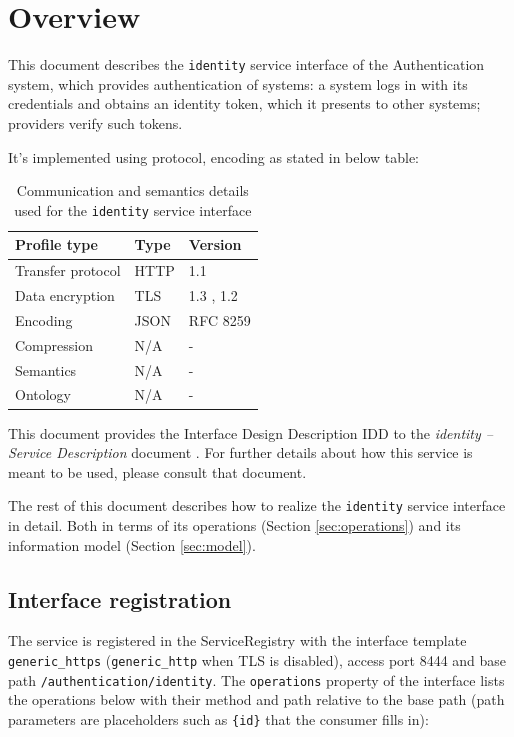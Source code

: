 \documentclass[a4paper]{arrowhead}
\begin{document}
\section{Overview}
\label{sec:overview}

This document describes the \texttt{identity} service interface of the Authentication system, which provides authentication of systems: a system logs in with its credentials and obtains an identity token, which it presents to other systems; providers verify such tokens.

It's implemented using protocol, encoding as stated in below table:
\begin{table}[ht!]
  \centering
  \begin{tabular}{|l|l|l|}
    \hline
    \rowcolor{gray!33} Profile type & Type & Version \\ \hline
    Transfer protocol & HTTP & 1.1 \cite{rfc9112} \\ \hline
    Data encryption & TLS & 1.3 \cite{rfc8446}, 1.2 \cite{rfc5246} \\ \hline
    Encoding & JSON & RFC 8259 \cite{rfc8259} \\ \hline
    Compression & N/A & - \\ \hline
    Semantics & N/A & - \\ \hline
    Ontology & N/A & - \\ \hline
  \end{tabular}
  \caption{Communication and semantics details used for the \texttt{identity} service interface}
  \label{tab:comunication_semantics_profile}
\end{table}

This document provides the Interface Design Description IDD to the \textit{identity -- Service Description} document \cite{auth-identity-sd}.
For further details about how this service is meant to be used, please consult that document.

The rest of this document describes how to realize the \texttt{identity} service
interface in detail. Both in terms of its operations (Section \ref{sec:operations}) and its information model (Section \ref{sec:model}).

\subsection{Interface registration}

The service is registered in the ServiceRegistry with the interface template \texttt{generic\_\allowbreak{}https} (\texttt{generic\_\allowbreak{}http} when TLS is disabled), access port 8444 and base path \texttt{/\allowbreak{}authentication/\allowbreak{}identity}. The \texttt{operations} property of the interface lists the operations below with their method and path relative to the base path (path parameters are placeholders such as \texttt{\{id\}} that the consumer fills in):
\end{document}
